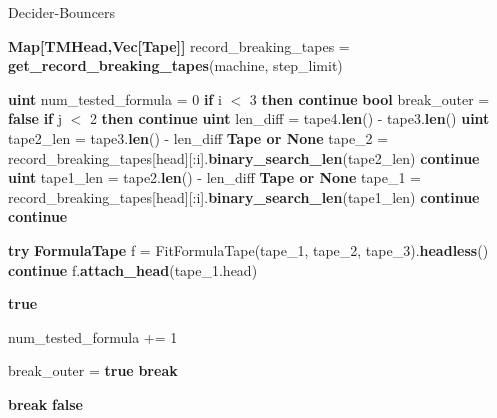 \begin{algorithm}[h!]
    \caption{{\sc Decider-Bouncers}}\label{alg:decider-bouncers}
    \begin{algorithmic}[1]


        \State \textbf{Map[TMHead,Vec[Tape]]} record\_breaking\_tapes = \textbf{get\_record\_breaking\_tapes}(machine, step\_limit)

        \State \textbf{uint} num\_tested\_formula = 0
        \State \textbf{if} i $<$ 3 \textbf{then continue}
        \State \textbf{bool} break\_outer = \textbf{false}
        \State \textbf{if} j $<$ 2 \textbf{then continue}
        \State \textbf{uint} len\_diff = tape4.\textbf{len}() - tape3.\textbf{len}()
        \State \textbf{uint} tape2\_len = tape3.\textbf{len}() - len\_diff
        \State \textbf{Tape or None} tape\_2 = record\_breaking\_tapes[head][:i].\textbf{binary\_search\_len}(tape2\_len)
        \State \textbf{continue}
        \EndIf
        \State
        \State \textbf{uint} tape1\_len = tape2.\textbf{len}() - len\_diff
        \State \textbf{Tape or None} tape\_1 = record\_breaking\_tapes[head][:i].\textbf{binary\_search\_len}(tape1\_len)
        \State \textbf{continue}
        \EndIf
        \State
        \State \textbf{continue}
        \EndIf

        \State

        \State \textbf{try} \textbf{FormulaTape} f = {\sc FitFormulaTape}(tape\_1, tape\_2, tape\_3).\textbf{headless}()
        \State \textbf{continue}
        \EndIf
        \State
        \State f.\textbf{attach\_head}(tape\_1.head)

        \State \Return \textbf{true}

        \EndIf

        \State
        \State num\_tested\_formula += 1

        \State
        \State break\_outer = \textbf{true}
        \State \textbf{break}
        \EndIf


        \EndFor
        \State
        \State \textbf{break}
        \EndIf
        \EndFor
        \EndFor
        \State \Return \textbf{false}
        \EndProcedure
    \end{algorithmic}
\end{algorithm}

